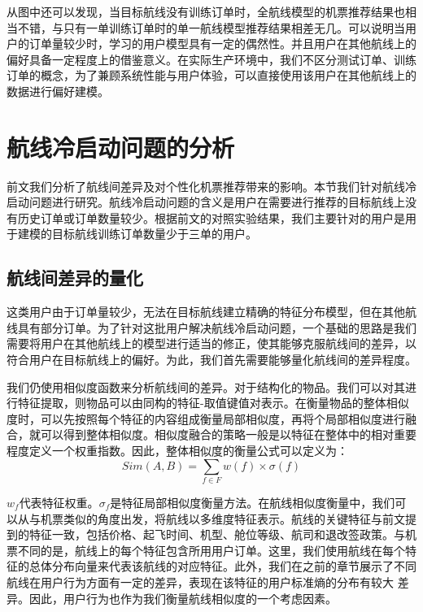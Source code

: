 从图中还可以发现，当目标航线没有训练订单时，全航线模型的机票推荐结果也相当不错，与只有一单训练订单时的单一航线模型推荐结果相差无几。可以说明当用户的订单量较少时，学习的用户模型具有一定的偶然性。并且用户在其他航线上的偏好具备一定程度上的借鉴意义。在实际生产环境中，我们不区分测试订单、训练订单的概念，为了兼顾系统性能与用户体验，可以直接使用该用户在其他航线上的数据进行偏好建模。

\section{航线冷启动问题的分析}
前文我们分析了航线间差异及对个性化机票推荐带来的影响。本节我们针对航线冷启动问题进行研究。航线冷启动问题的含义是用户在需要进行推荐的目标航线上没有历史订单或订单数量较少。根据前文的对照实验结果，我们主要针对的用户是用于建模的目标航线训练订单数量少于三单的用户。

\subsection{航线间差异的量化}

这类用户由于订单量较少，无法在目标航线建立精确的特征分布模型，但在其他航线具有部分订单。为了针对这批用户解决航线冷启动问题，一个基础的思路是我们需要将用户在其他航线上的模型进行适当的修正，使其能够克服航线间的差异，以符合用户在目标航线上的偏好。为此，我们首先需要能够量化航线间的差异程度。

我们仍使用相似度函数来分析航线间的差异。对于结构化的物品。我们可以对其进行特征提取，则物品可以由同构的特征-取值键值对表示。在衡量物品的整体相似度时，可以先按照每个特征的内容组成衡量局部相似度，再将个局部相似度进行融合，就可以得到整体相似度。相似度融合的策略一般是以特征在整体中的相对重要程度定义一个权重指数。因此，整体相似度的衡量公式可以定义为：
\begin{equation}
\label{eq:line_sim}
	Sim(A,B) = \sum_{f \in F}w(f) \times \sigma(f)
\end{equation}

$w_f$代表特征权重。$\sigma_f$是特征局部相似度衡量方法。在航线相似度衡量中，我们可以从与机票类似的角度出发，将航线以多维度特征表示。航线的关键特征与前文提到的特征一致，包括价格、起飞时间、机型、舱位等级、航司和退改签政策。与机票不同的是，航线上的每个特征包含所用用户订单。这里，我们使用航线在每个特征的总体分布向量来代表该航线的对应特征。此外，我们在之前的章节展示了不同航线在用户行为方面有一定的差异，表现在该特征的用户标准熵的分布有较大
差异。因此，用户行为也作为我们衡量航线相似度的一个考虑因素。


